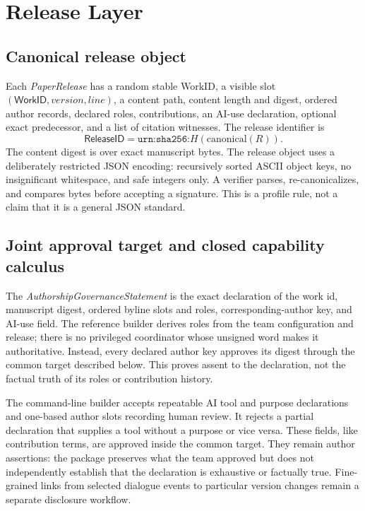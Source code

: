 \documentclass[conference,compsoc]{IEEEtran}
\newcommand{\workid}{\textsf{WorkID}}
\newcommand{\releaseid}{\textsf{ReleaseID}}
\begin{document}
\section{Release Layer}

\subsection{Canonical release object}

Each \emph{PaperRelease} has a random stable \workid, a visible slot $(\workid,\textit{version},\textit{line})$, a content path, content length and digest, ordered author records, declared roles, contributions, an AI-use declaration, optional exact predecessor, and a list of citation witnesses. The release identifier is
\[
  \releaseid = \texttt{urn:sha256:}H(\mathrm{canonical}(R)).
\]
The content digest is over exact manuscript bytes. The release object uses a deliberately restricted JSON encoding: recursively sorted ASCII object keys, no insignificant whitespace, and safe integers only. A verifier parses, re-canonicalizes, and compares bytes before accepting a signature. This is a profile rule, not a claim that it is a general JSON standard.

\subsection{Joint approval target and closed capability calculus}

The \emph{AuthorshipGovernanceStatement} is the exact declaration of the work
id, manuscript digest, ordered byline slots and roles, corresponding-author key,
and AI-use field. The reference builder derives roles from the team configuration and release;
there is no privileged coordinator whose unsigned word makes it authoritative.
Instead, every declared author key approves its digest through the common
target described below. This proves assent to the declaration, not the factual
truth of its roles or contribution history.

The command-line builder accepts repeatable AI tool and purpose declarations
and one-based author slots recording human review. It rejects a partial
declaration that supplies a tool without a purpose or vice versa. These fields,
like contribution terms, are approved inside the common target. They remain
author assertions: the package preserves what the team approved but does not
independently establish that the declaration is exhaustive or factually true.
Fine-grained links from selected dialogue events to particular version changes
remain a separate disclosure workflow.
\end{document}
